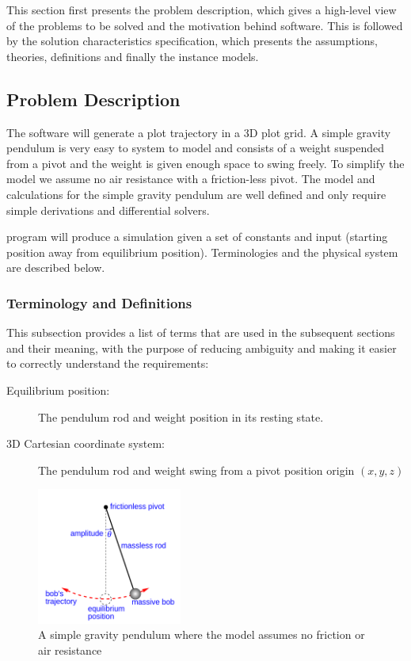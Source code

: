 \documentclass[12pt]{article}
\begin{document}
This section first presents the problem description, which gives a high-level
view of the problems to be solved and the motivation behind \progname software.
This is followed by the solution
characteristics specification, which presents the assumptions, theories, 
definitions and finally the instance models.

\subsection{Problem Description}

The \progname software will generate a plot trajectory in a 3D plot grid.
A simple gravity pendulum is very easy to system to model and consists of a
weight suspended from a pivot and the weight is given enough space to swing
freely. To simplify the model we assume no air resistance with a friction-less
pivot. The model and calculations for the simple gravity pendulum are well
defined and only require simple derivations and differential solvers.

\progname program will produce a simulation given a set of constants and input 
(starting position away from equilibrium position).
Terminologies and the physical system are described below.

\subsubsection{Terminology and Definitions}

This subsection provides a list of terms that are used in the subsequent
sections and their meaning, with the purpose of reducing ambiguity and making
it easier to correctly understand the requirements:

\begin{description}
\item[Equilibrium position:] The pendulum rod and weight position in its 
resting state.
\item[3D Cartesian coordinate system:] The pendulum rod and weight swing from a
pivot position origin $(x,y,z)$
\end{description}

\begin{figure}[H]
	\centering
	\includegraphics[width=180px]{simple-pend.png}
\caption{A simple gravity pendulum where the model assumes no friction or air
resistance}
	\label{fig:maxresdefault}
\end{figure}
\end{document}
